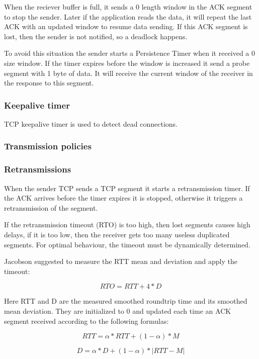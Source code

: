 When the reciever buffer is full, it sends a 0 length window in the ACK segment
to stop the sender. Later if the application reads the data,
it will repeat the last ACK with an updated window to resume data sending.
If this ACK segment is lost, then the sender is not notified, so a deadlock
happens.

To avoid this situation the sender starts a Persistence Timer when it received
a 0 size window. If the timer expires before the window is increased it send
a probe segment with 1 byte of data. It will receive the current window of the
receiver in the response to this segment.

\subsubsection*{Keepalive timer}

TCP keepalive timer is used to detect dead connections.

\subsubsection{Transmission policies}
\label{subsec:trans_policies}

\subsubsection*{Retransmissions}


When the sender TCP sends a TCP segment it starts a
retransmission timer.
If the ACK arrives before the timer expires it is stopped,
otherwise it triggers a retransmission of the segment.

If the retransmission timeout (RTO) is too high, then lost segments
causes high delays, if it is too low, then the receiver gets
too many useless duplicated segments. For optimal behaviour, the
timeout must be dynamically determined.

Jacobson suggested to measure the RTT mean and deviation
and apply the timeout:

$$ RTO = RTT + 4 * D $$

Here RTT and D are the measured smoothed roundtrip time and its
smoothed mean deviation. They are initialized to 0 and updated each time an
ACK segment received according to the following formulas:

$$ RTT = \alpha*RTT + (1-\alpha) * M $$

$$ D = \alpha*D + (1-\alpha)*|RTT-M| $$

